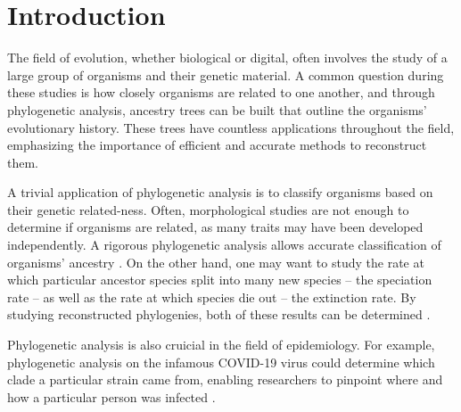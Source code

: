 \section{Introduction} \label{sec:introduction}

The field of evolution, whether biological or digital, often involves the study of a large group of organisms and their genetic material. A common question during these studies is how closely organisms are related to one another, and through phylogenetic analysis, ancestry trees can be built that outline the organisms' evolutionary history. These trees have countless applications throughout the field, emphasizing the importance of efficient and accurate methods to reconstruct them.

A trivial application of phylogenetic analysis is to classify organisms based on their genetic related-ness. Often, morphological studies are not enough to determine if organisms are related, as many traits may have been developed independently. A rigorous phylogenetic analysis allows accurate classification of organisms' ancestry \citep{abaza2020what}. On the other hand, one may want to study the rate at which particular ancestor species split into many new species -- the speciation rate -- as well as the rate at which species die out -- the extinction rate. By studying reconstructed phylogenies, both of these results can be determined \citep{stadler2013recovering}.

Phylogenetic analysis is also cruicial in the field of epidemiology. For example, phylogenetic analysis on the infamous COVID-19 virus could determine which clade a particular strain came from, enabling researchers to pinpoint where and how a particular person was infected \citep{wang2020role}.
